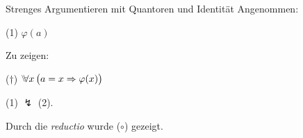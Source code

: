 \documentclass[a4paper,12pt]{scrartcl}
\begin{document}
\begin{task}{Strenges Argumentieren mit Quantoren und Identität}
\vspace{2pt}
Angenommen: 

\vspace{2pt}
(1) \hspace*{1em} $\varphi(a)$

\vspace{2pt}
Zu zeigen:

\vspace{2pt}
($\dagger$) \hspace*{1em} $\Forall x \, \big(a=x \Then \varphi(x)\big)$

\vspace{10pt}
(1) $\lightning$ (2). 
\vspace{15pt}

\end{task}



Durch die \emph{reductio} wurde ($\circ$) gezeigt.
\end{document}

